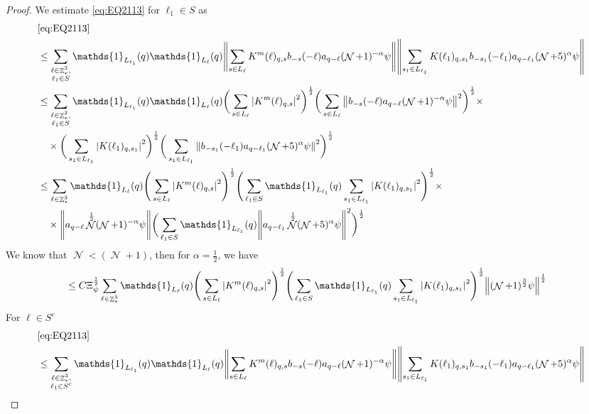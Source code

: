 \documentclass[12pt,a4paper]{article}
\numberwithin{equation}{section}
\newcommand{\1}{\mathbb{I}}
\DeclareMathOperator{\Z}{\mathbb{Z}}
\DeclareMathOperator{\NN}{\mathcal{N}}
\newcommand{\half}{\frac{1}{2}}
\theoremstyle{plain}
\theoremstyle{definition}
\theoremstyle{remark}
\theoremstyle{plain}
\theoremstyle{definition}
\theoremstyle{remark}
\begin{document}
\begin{proof}
	We estimate \eqref{eq:EQ2113} for $\ell_1 \in S$ as
	\begin{align}
		&\eqref{eq:EQ2113}\nonumber\\
		&\leq\sum\limits_{\substack{\ell\in \Z^3_*,\\ \ell_1\in S}} \mathds{1}_{L_{\ell_1}}(q) \mathds{1}_{L_{\ell}}(q)  \norm{ \sum\limits_{s\in L_{\ell}} K^m(\ell)_{q,s} b_{-s}(-\ell) a_{q-\ell}(\NN+1)^{-\alpha}\psi}\norm{ \sum\limits_{s_1 \in L_{\ell_1}} K(\ell_1)_{q,s_1} b_{-s_1}(-\ell_1)a_{q-\ell_1} (\NN+5)^{\alpha} \psi }\nonumber\\
		&\leq\sum\limits_{\substack{\ell\in \Z^3_*,\\ \ell_1\in S}} \mathds{1}_{L_{\ell_1}}(q) \mathds{1}_{L_{\ell}}(q)  \bigg(\sum\limits_{s\in L_{\ell}}\abs{  K^m(\ell)_{q,s}}^2 \bigg)^\half \bigg(\sum\limits_{s\in L_{\ell}}\norm{   b_{-s}(-\ell) a_{q-\ell}(\NN+1)^{-\alpha}\psi}^2\bigg)^\half \times \\ &\quad \times\bigg(\sum\limits_{s_1\in L_{\ell_1}}\abs{  K(\ell_1)_{q,s_1}}^2 \bigg)^\half \bigg(\sum\limits_{s_1 \in L_{\ell_1}}\norm{ b_{-s_1}(-\ell_1)a_{q-\ell_1} (\NN+5)^{\alpha} \psi }^2\bigg)^\half\nonumber\\
		&\leq\sum\limits_{\ell\in \Z^3_*}  \mathds{1}_{L_{\ell}}(q) \Bigg(\sum\limits_{s \in L_{\ell}} \abs{K^m(\ell)_{q,s}}^2\Bigg)^\half \Bigg(\sum\limits_{ \ell_1\in S} \mathds{1}_{L_{\ell_1}}(q)\sum\limits_{s_1 \in L_{\ell_1}} \abs{K(\ell_1)_{q,s_1}}^2\Bigg)^\half \times \\ &\quad\times \norm{ a_{q-\ell} \NN^\half (\NN+1)^{-\alpha}\psi} \bigg(\sum\limits_{ \ell_1\in S} \mathds{1}_{L_{\ell_1}}(q) \norm{ a_{q-\ell_1} \NN^\half (\NN+5)^{\alpha} \psi }^2\bigg)^\half\nonumber\\
	\end{align}
	We know that $\NN<(\NN+1)$, then for $\alpha = \half$, we have
	\begin{align}
		&\leq C \Xi_{\psi}^\half \sum\limits_{\ell\in \Z^3_*}  \mathds{1}_{L_{\ell}}(q) \Bigg(\sum\limits_{s \in L_{\ell}} \abs{K^m(\ell)_{q,s}}^2\Bigg)^\half \Bigg(\sum\limits_{ \ell_1\in S} \mathds{1}_{L_{\ell_1}}(q)\sum\limits_{s_1 \in L_{\ell_1}} \abs{K(\ell_1)_{q,s_1}}^2\Bigg)^\half\norm{ (\NN+1)^{\frac{3}{2}}\psi}^\half  \label{eq:estEQ2113}
	\end{align}
	For $\ell \in S^c$
	\begin{align}
		&\eqref{eq:EQ2113}\nonumber\\
		&\leq\sum\limits_{\substack{\ell\in \Z^3_*,\\ \ell_1\in S^c}} \mathds{1}_{L_{\ell_1}}(q) \mathds{1}_{L_{\ell}}(q)  \norm{ \sum\limits_{s\in L_{\ell}} K^m(\ell)_{q,s} b_{-s}(-\ell) a_{q-\ell}(\NN+1)^{-\alpha}\psi}\norm{ \sum\limits_{s_1 \in L_{\ell_1}} K(\ell_1)_{q,s_1} b_{-s_1}(-\ell_1)a_{q-\ell_1} (\NN+5)^{\alpha} \psi }\nonumber\\

\end{align}
\end{proof}
\end{document}
